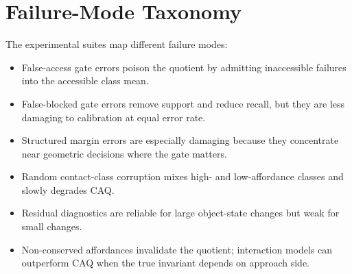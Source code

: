 \documentclass{article}
\begin{document}
\begin{table}[h]
\centering
\caption{Severe cross shift over 20 seeds. Heavy clutter makes access dominate the outcome, so all calibrated gate-aware predictors have lower Brier than in the medium shift.}
\label{tab:severe}
\end{table}

\section{Failure-Mode Taxonomy}

The experimental suites map different failure modes:

\begin{itemize}
    \item False-access gate errors poison the quotient by admitting inaccessible failures into the accessible class mean.
    \item False-blocked gate errors remove support and reduce recall, but they are less damaging to calibration at equal error rate.
    \item Structured margin errors are especially damaging because they concentrate near geometric decisions where the gate matters.
    \item Random contact-class corruption mixes high- and low-affordance classes and slowly degrades CAQ.
    \item Residual diagnostics are reliable for large object-state changes but weak for small changes.
    \item Non-conserved affordances invalidate the quotient; interaction models can outperform CAQ when the true invariant depends on approach side.
\end{itemize}
\end{document}
